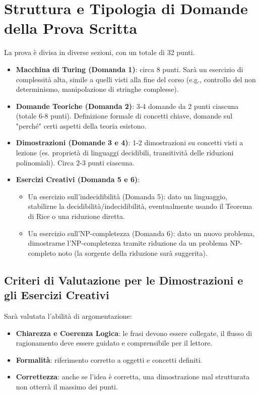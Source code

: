 \documentclass[a4paper]{article}
\theoremstyle{definition} %
\begin{document}
\section{Struttura e Tipologia di Domande della Prova Scritta}
La prova è divisa in diverse sezioni, con un totale di 32 punti.
\begin{itemize}
    \item \textbf{Macchina di Turing (Domanda 1)}: circa 8 punti. Sarà un esercizio di complessità alta, simile a quelli visti alla fine del corso (e.g., controllo del non determinismo, manipolazione di stringhe complesse).
    \item \textbf{Domande Teoriche (Domanda 2)}: 3-4 domande da 2 punti ciascuna (totale 6-8 punti). Definizione formale di concetti chiave, domande sul "perché" certi aspetti della teoria esistono.
    \item \textbf{Dimostrazioni (Domande 3 e 4)}: 1-2 dimostrazioni su concetti visti a lezione (es. proprietà di linguaggi decidibili, transitività delle riduzioni polinomiali). Circa 2-3 punti ciascuna.
    \item \textbf{Esercizi Creativi (Domanda 5 e 6)}:
    \begin{itemize}
        \item Un esercizio sull'indecidibilità (Domanda 5): dato un linguaggio, stabilirne la decidibilità/indecidibilità, eventualmente usando il Teorema di Rice o una riduzione diretta.
        \item Un esercizio sull'NP-completezza (Domanda 6): dato un nuovo problema, dimostrarne l'NP-completezza tramite riduzione da un problema NP-completo noto (la sorgente della riduzione sarà suggerita).
    \end{itemize}
\end{itemize}

\subsection{Criteri di Valutazione per le Dimostrazioni e gli Esercizi Creativi}
Sarà valutata l'abilità di argomentazione:
\begin{itemize}
    \item \textbf{Chiarezza e Coerenza Logica}: le frasi devono essere collegate, il flusso di ragionamento deve essere guidato e comprensibile per il lettore.
    \item \textbf{Formalità}: riferimento corretto a oggetti e concetti definiti.
    \item \textbf{Correttezza}: anche se l'idea è corretta, una dimostrazione mal strutturata non otterrà il massimo dei punti.
\end{itemize}
\end{document}
